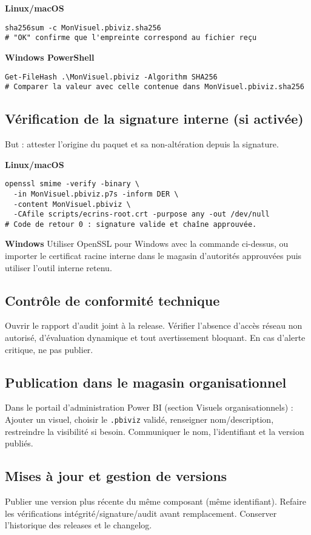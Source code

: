 \textbf{Linux/macOS}
\begin{verbatim}
sha256sum -c MonVisuel.pbiviz.sha256
# "OK" confirme que l'empreinte correspond au fichier reçu
\end{verbatim}

\textbf{Windows PowerShell}
\begin{verbatim}
Get-FileHash .\MonVisuel.pbiviz -Algorithm SHA256
# Comparer la valeur avec celle contenue dans MonVisuel.pbiviz.sha256
\end{verbatim}

\subsection{Vérification de la signature interne (si activée)}
But : attester l’origine du paquet et sa non-altération depuis la signature.

\textbf{Linux/macOS}
\begin{verbatim}
openssl smime -verify -binary \
  -in MonVisuel.pbiviz.p7s -inform DER \
  -content MonVisuel.pbiviz \
  -CAfile scripts/ecrins-root.crt -purpose any -out /dev/null
# Code de retour 0 : signature valide et chaîne approuvée.
\end{verbatim}

\textbf{Windows}
Utiliser OpenSSL pour Windows avec la commande ci-dessus, ou importer le certificat racine interne dans le magasin d’autorités approuvées puis utiliser l’outil interne retenu.

\subsection{Contrôle de conformité technique}
Ouvrir le rapport d’audit joint à la release. Vérifier l’absence d’accès réseau non autorisé, d’évaluation dynamique et tout avertissement bloquant. En cas d’alerte critique, ne pas publier.

\subsection{Publication dans le magasin organisationnel}
Dans le portail d’administration Power BI (section Visuels organisationnels) : Ajouter un visuel, choisir le \texttt{.pbiviz} validé, renseigner nom/description, restreindre la visibilité si besoin. Communiquer le nom, l’identifiant et la version publiés.

\subsection{Mises à jour et gestion de versions}
Publier une version plus récente du même composant (même identifiant). Refaire les vérifications intégrité/signature/audit avant remplacement. Conserver l’historique des releases et le changelog.


